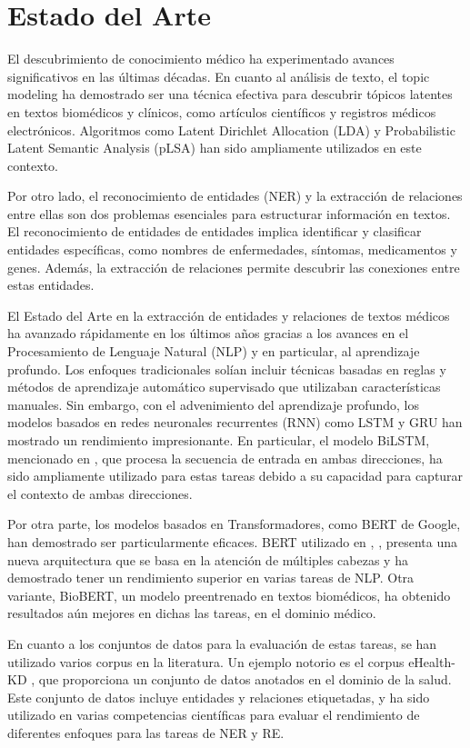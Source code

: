 \documentclass[10pt]{article} %
\begin{document}
	\section{Estado del Arte}
		
	El descubrimiento de conocimiento médico ha experimentado avances significativos en las últimas décadas. En cuanto al análisis de texto, el topic modeling ha demostrado ser una técnica efectiva para descubrir tópicos latentes en textos biomédicos y clínicos, como artículos científicos y registros médicos electrónicos. Algoritmos como Latent Dirichlet Allocation (LDA) y Probabilistic Latent Semantic Analysis (pLSA) han sido ampliamente utilizados en este contexto.
	
	Por otro lado, el reconocimiento de entidades (NER) y la extracci\'on de relaciones entre ellas son dos problemas esenciales para estructurar información en textos. El reconocimiento de entidades de entidades implica identificar y clasificar entidades específicas, como nombres de enfermedades, síntomas, medicamentos y genes. Además, la extracción de relaciones permite descubrir las conexiones entre estas entidades. 
	
	El Estado del Arte en la extracción de entidades y relaciones de textos médicos ha avanzado rápidamente en los últimos años gracias a los avances en el Procesamiento de Lenguaje Natural (NLP) y en particular, al aprendizaje profundo. Los enfoques tradicionales solían incluir técnicas basadas en reglas y métodos de aprendizaje automático supervisado que utilizaban características manuales. Sin embargo, con el advenimiento del aprendizaje profundo, los modelos basados en redes neuronales recurrentes (RNN) como LSTM y GRU han mostrado un rendimiento impresionante. En particular, el modelo BiLSTM, mencionado en \cite{bilstm1}, que procesa la secuencia de entrada en ambas direcciones, ha sido ampliamente utilizado para estas tareas debido a su capacidad para capturar el contexto de ambas direcciones.
	
	Por otra parte, los modelos basados en Transformadores, como BERT \cite{bert} de Google, han demostrado ser particularmente eficaces. BERT utilizado en \cite{bert1}, \cite{bert2}, presenta una nueva arquitectura que se basa en la atención de múltiples cabezas y ha demostrado tener un rendimiento superior en varias tareas de NLP. Otra variante, BioBERT, un modelo preentrenado en textos biomédicos, ha obtenido resultados aún mejores en dichas las tareas, en el dominio médico.
	
	En cuanto a los conjuntos de datos para la evaluación de estas tareas, se han utilizado varios corpus en la literatura. Un ejemplo notorio es el corpus eHealth-KD \cite{corpus}, que proporciona un conjunto de datos anotados en el dominio de la salud. Este conjunto de datos incluye entidades y relaciones etiquetadas, y ha sido utilizado en varias competencias científicas para evaluar el rendimiento de diferentes enfoques para las tareas de NER y RE.
	
\end{document}
